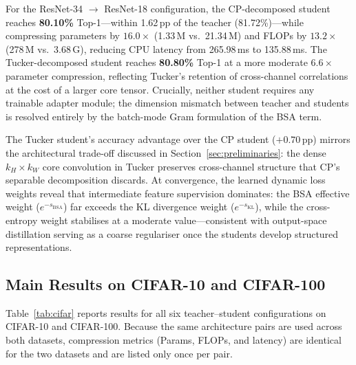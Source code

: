 \documentclass[conference]{IEEEtran}
\begin{document}
For the ResNet-34 $\to$ ResNet-18 configuration, the CP-decomposed student
reaches \textbf{80.10\%} Top-1—within 1.62\,pp of the teacher (81.72\%)—while
compressing parameters by $16.0\times$ (1.33\,M vs.\ 21.34\,M) and FLOPs by
$13.2\times$ (278\,M vs.\ 3.68\,G), reducing CPU latency from 265.98\,ms to
135.88\,ms.
The Tucker-decomposed student reaches \textbf{80.80\%} Top-1 at a more
moderate $6.6\times$ parameter compression, reflecting Tucker's retention of
cross-channel correlations at the cost of a larger core tensor.
Crucially, neither student requires any trainable adapter module; the
dimension mismatch between teacher and students is resolved entirely by the
batch-mode Gram formulation of the BSA term.

The Tucker student's accuracy advantage over the CP student ($+0.70$\,pp)
mirrors the architectural trade-off discussed in
Section~\ref{sec:preliminaries}: the dense $k_H{\times}k_W$ core convolution
in Tucker preserves cross-channel structure that CP's separable decomposition
discards.
At convergence, the learned dynamic loss weights reveal that intermediate
feature supervision dominates: the BSA effective weight
($e^{-s_{\mathrm{BSA}}}$) far exceeds the KL divergence weight
($e^{-s_{\mathrm{KL}}}$), while the cross-entropy weight stabilises at a
moderate value—consistent with output-space distillation serving as a coarse
regulariser once the students develop structured representations.

\subsection{Main Results on CIFAR-10 and CIFAR-100}
\label{sec:results_cifar}

Table~\ref{tab:cifar} reports results for all six teacher--student
configurations on CIFAR-10 and CIFAR-100. Because the same architecture
pairs are used across both datasets, compression metrics (Params, FLOPs,
and latency) are identical for the two datasets and are listed only once
per pair.
\end{document}
